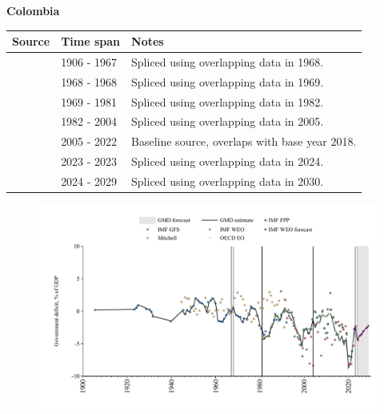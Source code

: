 \documentclass[12pt,a4paper,landscape]{article}
\begin{document}
\begin{adjustbox}{max totalsize={\paperwidth}{\paperheight},center}
\begin{minipage}[t][\textheight][t]{\textwidth}
\vspace*{0.5cm}
{}
\begin{center}
{\Large\bfseries Colombia}
\end{center}
\vspace{0.5cm}
\begin{table}[H]
\centering
\small
\begin{tabular}{|l|l|l|}
\hline
\textbf{Source} & \textbf{Time span} & \textbf{Notes} \\
\hline
\rowcolor{white}\cite{IMF_FPP}& 1906 - 1967 &Spliced using overlapping data in 1968.\\
\rowcolor{lightgray}\cite{Mitchell}& 1968 - 1968 &Spliced using overlapping data in 1969.\\
\rowcolor{white}\cite{IMF_FPP}& 1969 - 1981 &Spliced using overlapping data in 1982.\\
\rowcolor{lightgray}\cite{IMF_WEO}& 1982 - 2004 &Spliced using overlapping data in 2005.\\
\rowcolor{white}\cite{OECD_EO}& 2005 - 2022 &Baseline source, overlaps with base year 2018.\\
\rowcolor{lightgray}\cite{IMF_GFS}& 2023 - 2023 &Spliced using overlapping data in 2024.\\
\rowcolor{white}\cite{IMF_WEO_forecast}& 2024 - 2029 &Spliced using overlapping data in 2030.\\
\hline
\end{tabular}
\end{table}
\begin{figure}[H]
\centering
\includegraphics[width=\textwidth,height=0.6\textheight,keepaspectratio]{graphs/COL_govdef_GDP.pdf}
\end{figure}
\end{minipage}
\end{adjustbox}
\end{document}
